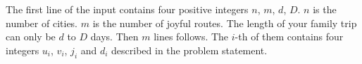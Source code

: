 The first line of the input contains four positive integers $n$, $m$, $d$, $D$.
$n$ is the number of cities. $m$ is the number of joyful routes. The length of your family trip can only be
$d$ to $D$ days.
Then $m$ lines follows.  
The $i$-th of them contains four integers $u_i$, $v_i$, $j_i$ and $d_i$ described in the problem statement.
